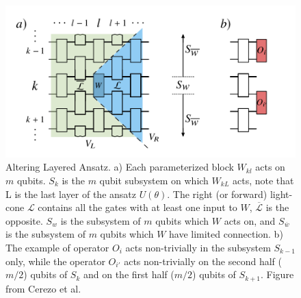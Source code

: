 \begin{figure}
    \centering
    \includegraphics[scale=0.5]{LiteratureReview/Appendices/alterlayeransatz.png}
    \caption{
        Altering Layered Ansatz.
        a) Each parameterized block $W_{kl}$ acts on $m$ qubits.
        $S_k$ is the $m$ qubit subsystem on which $W_{kL}$ acts, note that L is the last layer of the ansatz $U(\theta)$.
        The right (or forward) light-cone $\mathcal{L}$ contains all the gates with at least one input to $W$, $\overline{\mathcal{L}}$ is the opposite.
        $S_w$ is the subsystem of $m$ qubits which $W$ acts on, and $S_{\overline{w}}$ is the subsystem of $m$ qubits which $W$ have limited connection.
        b) The example of operator $O_i$ acts non-trivially in the subsystem $S_{k-1}$ only, while the operator $O_{i'}$ acts non-trivially on the second half ($m/2$) qubits of $S_k$ and on the first half ($m/2$) qubits of $S_{k+1}$.
        Figure from Cerezo et al. \cite{cerezoCostFunctionDependent2021}
    }
    \label{Altering Layered Ansatz}
\end{figure}

